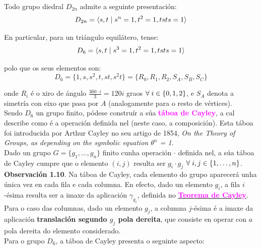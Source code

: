 \documentclass[twoside]{report}
\newcommand{\magbf}[1]{\textcolor{magenta}{\textbf{#1}}} %
\theoremstyle{mystyle}
\begin{document}
\noindent Todo grupo diedral $D_{2n}$ admite a seguinte presentación:
$$D_{2n} = \langle s, t \hspace{1mm} | \hspace{1mm} s^{n} = 1, t^{2} = 1, tsts = 1 \rangle$$

\noindent En particular, para un triángulo equilátero, tense:
$$D_{6} = \langle s, t \hspace{1mm} | \hspace{1mm} s^{3} = 1, t^{2} = 1, tsts = 1 \rangle$$

\noindent polo que os seus elementos son:
$$D_{6} = \{1,s,s^{2},t,st,s^{2}t\} = \{R_{0},R_{1},R_{2},S_{A},S_{B},S_{C}\}$$

\noindent onde $R_{i}$ é o xiro de ángulo $\displaystyle \frac{360 \cdot i}{3} = 120i$ graos $\forall \hspace{1mm} i \in \{0,1,2\}$, e $S_{A}$ denota a simetría con eixo que pasa por $A$ (analogamente para o resto de vértices).\\

\noindent Sendo $D_{6}$ un grupo finito, pódese construír a súa \magbf{táboa de Cayley}, a cal describe como é a operación definida nel (neste caso, a composición). Esta táboa foi introducida por Arthur Cayley no seu artigo de 1854, \textit{On the Theory of Groups, as depending on the symbolic equation $\theta^{n}$ = 1}.\\

\noindent Dado un grupo $G = \{g_{1}, \dots, g_{n}\}$ finito cunha operación $\cdot$ definida nel, a súa táboa de Cayley cumpre que o elemento $(i,j)$ resulta ser $g_{i} \cdot g_{j}$ $\forall \hspace{1mm} i,j \in \{1, \dots, n\}$.\\

\noindent \textbf{Observación 1.10}. Na táboa de Cayley, cada elemento do grupo aparecerá unha única vez en cada fila e cada columna. En efecto, dado un elemento $g_{i}$, a fila $i$-ésima resulta ser a imaxe da aplicación $\gamma_{g_{i}}$, definida no \hyperref[th1.9]{\magbf{Teorema de Cayley}}. Para o caso das columnas, dado un elemento $g_{j}$, a columna $j$-ésima é a imaxe da aplicación \textbf{translación segundo $g_{j}$ pola dereita}, que consiste en operar con $a$ pola dereita do elemento considerado.\\

\noindent Para o grupo $D_{6}$, a táboa de Cayley presenta o seguinte aspecto: 
\end{document}
